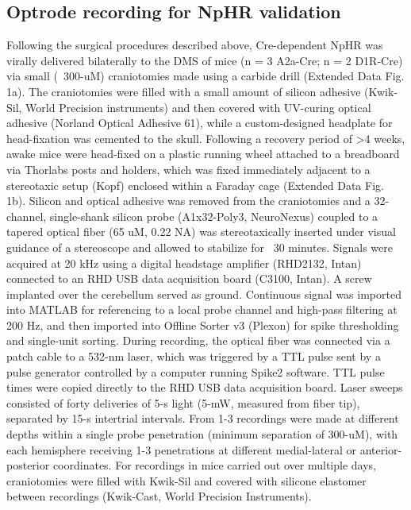 \subsection{Optrode recording for NpHR validation}
\label{sec:ap1:m3}
Following the surgical procedures described above, Cre-dependent NpHR was virally delivered bilaterally to the DMS of mice (n = 3 A2a-Cre; n = 2 D1R-Cre) via small (~300-uM) craniotomies made using a carbide drill (Extended Data Fig. 1a). The craniotomies were filled with a small amount of silicon adhesive (Kwik-Sil, World Precision instruments) and then covered with UV-curing optical adhesive (Norland Optical Adhesive 61), while a custom-designed headplate for head-fixation was cemented to the skull. Following a recovery period of >4 weeks, awake mice were head-fixed on a plastic running wheel attached to a breadboard via Thorlabs posts and holders, which was fixed immediately adjacent to a stereotaxic setup (Kopf) enclosed within a Faraday cage (Extended Data Fig. 1b). Silicon and optical adhesive was removed from the craniotomies and a 32-channel, single-shank silicon probe (A1x32-Poly3, NeuroNexus) coupled to a tapered optical fiber (65 uM, 0.22 NA) was stereotaxically inserted under visual guidance of a stereoscope and allowed to stabilize for ~30 minutes. Signals were acquired at 20 kHz using a digital headstage amplifier (RHD2132, Intan) connected to an RHD USB data acquisition board (C3100, Intan). A screw implanted over the cerebellum served as ground. Continuous signal was imported into MATLAB for referencing to a local probe channel and high-pass filtering at 200 Hz, and then imported into Offline Sorter v3 (Plexon) for spike thresholding and single-unit sorting. During recording, the optical fiber was connected via a patch cable to a 532-nm laser, which was triggered by a TTL pulse sent by a pulse generator controlled by a computer running Spike2 software. TTL pulse times were copied directly to the RHD USB data acquisition board. Laser sweeps consisted of forty deliveries of 5-s light (5-mW, measured from fiber tip), separated by 15-s intertrial intervals. From 1-3 recordings were made at different depths within a single probe penetration (minimum separation of 300-uM), with each hemisphere receiving 1-3 penetrations at different medial-lateral or anterior-posterior coordinates. For recordings in mice carried out over multiple days, craniotomies were filled with Kwik-Sil and covered with silicone elastomer between recordings (Kwik-Cast, World Precision Instruments).